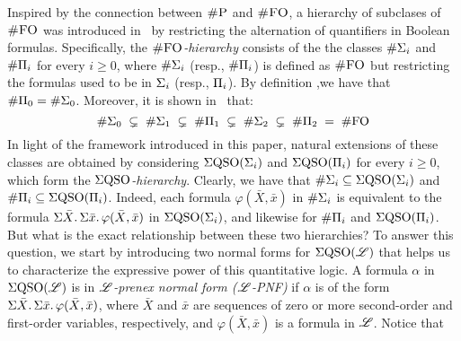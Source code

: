 
Inspired by the connection between $\text{\sc \#P}$ and $\text{\sc \#FO}$, a hierarchy of subclases of $\text{\sc \#FO}$ was introduced in~\cite{SalujaST95} 
by restricting the alternation of quantifiers in Boolean formulas.
Specifically, the \emph{$\text{\sc \#FO}$-hierarchy} consists of the 
the classes $\#\Sigma_{i}$ and $\#\Pi_{i}$ for every $i \geq 0$, where $\#\Sigma_{i}$ (resp., $\#\Pi_{i}$) is defined as $\text{\sc \#FO}$ but restricting the formulas used to be in $\Sigma_{i}$ (resp., $\Pi_{i}$).
By definition ,we have that $\#\Pi_{0} = \#\Sigma_{0}$. Moreover, it is shown in~\cite{SalujaST95} that:
\[
\#\Sigma_{0} \; \subsetneq \; \#\Sigma_{1} \; \subsetneq \; \#\Pi_{1} \; \subsetneq \; \#\Sigma_{2} \; \subsetneq \; \#\Pi_{2} \; = \; \#{\rm FO} 
\]
In light of the framework introduced in this paper, natural extensions of these classes are obtained by considering 
$\Sigma{\rm QSO}(\Sigma_{i})$ and $\Sigma{\rm QSO}(\Pi_{i})$ for every $i \geq 0$, which form the \emph{$\Sigma{\rm QSO}$-hierarchy}.
Clearly, we have that $\#\Sigma_{i} \subseteq \Sigma{\rm QSO}(\Sigma_{i})$ and $\#\Pi_{i} \subseteq \Sigma{\rm QSO}(\Pi_{i})$. Indeed, each formula $\varphi(\bar{X}, \bar{x})$ in $\#\Sigma_{i}$ is equivalent to the formula $\Sigma{\bar X}.\, \Sigma{\bar x}.\, \varphi(\bar{X}, \bar{x})$ in $\Sigma{\rm QSO}(\Sigma_{i})$, and likewise for $\#\Pi_{i}$ and $\Sigma{\rm QSO}(\Pi_{i})$.
But what is the exact relationship between these two hierarchies?
To answer this question, we start by introducing two normal forms for $\Sigma{\rm QSO}(\mathscr{L})$ that helps us to characterize the expressive power of this quantitative logic.
A formula $\alpha$ in $\Sigma{\rm QSO}(\mathscr{L})$ is in \emph{$\mathscr{L}$-prenex normal form ($\mathscr{L}$-PNF)} 
if $\alpha$ is of the form
$\Sigma{\bar{X}}.\, \Sigma{\bar{x}}.\, \varphi(\bar{X}, \bar{x})$,
where $\bar{X}$ and $\bar{x}$ are sequences of zero or more second-order and first-order variables, respectively, and $\varphi(\bar{X}, \bar{x})$ is a formula in $\mathscr{L}$. Notice that 
